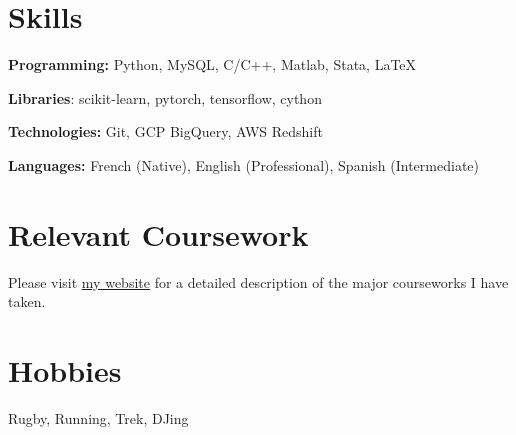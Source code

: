 \documentclass[letterpaper,11pt]{article}
\newcommand{\resumeSubHeadingListStart}{\begin{itemize}[leftmargin=0.15in, label={}]}
\newcommand{\resumeSubHeadingListEnd}{\end{itemize}}
\begin{document}
\section{Skills}
  \vspace{2pt}
  \resumeSubHeadingListStart
    \small{\item{
        \textbf{Programming:}{ Python, MySQL, C/C++, Matlab, Stata, \LaTeX} \\ \vspace{3pt}
        
        \textbf{Libraries}{: scikit-learn, pytorch, tensorflow, cython} \\ \vspace{3pt}

        \textbf{Technologies:}{ Git, GCP BigQuery, AWS Redshift} \\ \vspace{3pt}
        
        \textbf{Languages:}{ French (Native), English (Professional), Spanish (Intermediate)}
        
    }}
  \resumeSubHeadingListEnd




\section{Relevant Coursework}
  \vspace{2pt}
    \resumeSubHeadingListStart
      \small{\item{Please visit \href{https://tms-gvd.github.io}{my website} for a detailed description of the major courseworks I have taken.}}
    \resumeSubHeadingListEnd



\section{Hobbies}
  \resumeSubHeadingListStart
    \small{\item{Rugby, Running, Trek, DJing}}
  \resumeSubHeadingListEnd



\end{document}
